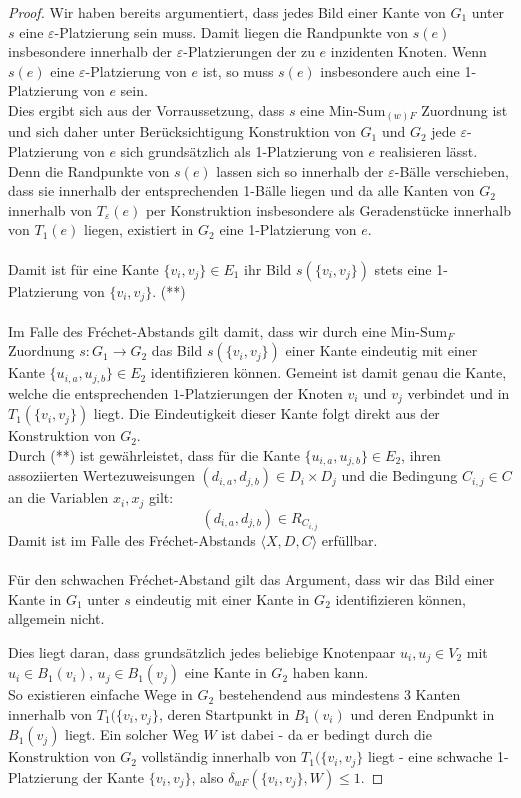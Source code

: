 \documentclass[a4paper, 12pt, twoside]{article}
\theoremstyle{Format1} %
\begin{document}
\begin{proof}
Wir haben bereits argumentiert, dass jedes Bild einer Kante von $G_1$ unter $s$ eine $\varepsilon$-Platzierung sein muss.
Damit liegen die Randpunkte von $s(e)$ insbesondere innerhalb der $\varepsilon$-Platzierungen der zu $e$ inzidenten Knoten.
Wenn $s(e)$ eine $\varepsilon$-Platzierung von $e$ ist, so muss $s(e)$ insbesondere auch eine 1-Platzierung von $e$ sein.
\\
Dies ergibt sich aus der Vorraussetzung, dass $s$ eine Min-Sum$_{(w)F}$ Zuordnung ist und sich daher unter Berücksichtigung Konstruktion
von $G_1$ und $G_2$ jede $\varepsilon$-Platzierung von $e$ sich grundsätzlich als 1-Platzierung von $e$ realisieren lässt.
\\
Denn die Randpunkte von $s(e)$ lassen sich so innerhalb der $\varepsilon$-Bälle verschieben, dass sie innerhalb der entsprechenden 1-Bälle liegen
und da alle Kanten von $G_2$ innerhalb von $T_{\varepsilon}(e)$
per Konstruktion insbesondere als Geradenstücke innerhalb von $T_1(e)$ liegen, existiert in $G_2$ eine 1-Platzierung von $e$.
\\
\\
Damit ist für eine Kante $\{v_i, v_j\} \in E_1$ ihr Bild $s(\{v_i, v_j\})$ stets eine 1-Platzierung von $\{v_i, v_j\}$. (**)
\\
\\
Im Falle des Fréchet-Abstands gilt damit, dass wir durch eine $\text{Min-Sum}_F$ Zuordnung $s: G_1 \to G_2$ das Bild $s(\{v_i, v_j\})$ einer Kante
eindeutig mit einer Kante $\{u_{i,a}, u_{j,b}\} \in E_2$ identifizieren können. Gemeint ist damit genau die Kante, welche
die entsprechenden $1$-Platzierungen der Knoten $v_i$ und $v_j$ verbindet und in $T_1(\{v_i, v_j\})$ liegt. Die Eindeutigkeit dieser Kante folgt direkt aus der
Konstruktion von $G_2$.
\\
Durch (**) ist gewährleistet, dass für die Kante $\{u_{i,a}, u_{j,b}\} \in E_2$, ihren assoziierten Wertezuweisungen $(d_{i,a}, d_{j,b}) \in D_i \times D_j$
und die Bedingung $C_{i,j} \in C$ an die Variablen $x_i, x_j$ gilt:
$$(d_{i,a},d_{j,b}) \in R_{C_{i,j}}$$
Damit ist im Falle des Fréchet-Abstands $\langle X,D,C \rangle$ erfüllbar.
\\
\\
Für den schwachen Fréchet-Abstand gilt das Argument, dass wir das Bild einer Kante in $G_1$ unter $s$ eindeutig mit einer Kante in $G_2$ identifizieren können, allgemein nicht.

Dies liegt daran, dass grundsätzlich jedes beliebige Knotenpaar $u_{i}, u_{j} \in V_2$ mit $u_{i} \in B_1(v_i)$, $u_{j} \in B_1(v_j)$ eine Kante in $G_2$ haben kann.
\\
So existieren einfache Wege in $G_2$ bestehendend aus mindestens 3 Kanten innerhalb von $T_1(\{v_i, v_j\}$, deren Startpunkt in $B_1(v_i)$ und deren Endpunkt in $B_1(v_j)$ liegt.
Ein solcher Weg $W$ ist dabei - da er bedingt durch die Konstruktion von $G_2$ vollständig innerhalb von $T_1(\{v_i, v_j\}$ liegt - eine schwache 1-Platzierung der Kante $\{v_i, v_j\}$,
also $\delta_{wF}(\{v_i, v_j\}, W) \leq 1$.


\end{proof}
\end{document}
